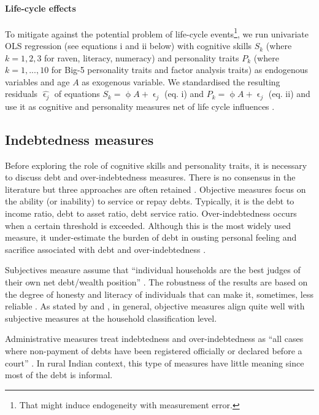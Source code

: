 \documentclass[a4paper, 11pt, onecolumn]{article}
\begin{document}
\paragraph{Life-cycle effects}
To mitigate against the potential problem of life-cycle events\footnote{That might induce endogeneity with measurement error.}, we run univariate OLS regression (see equations i and ii below) with cognitive skills $S_k$ (where $k=1, 2, 3$ for raven, literacy, numeracy) and personality traits $P_k$ (where $k=1,...,10$ for Big-5 personality traits and factor analysis traits) as endogenous variables and age $A$ as exogenous variable.
We standardised the resulting residuals $\hat{\upvarepsilon_j}$ of equations $S_k=\upphi A+\upvarepsilon_j$ (eq. i) and $P_k=\upphi A+\upvarepsilon_j$ (eq. ii) and use it as cognitive and personality measures net of life cycle influences \citep{Nyhus2005, Brown2014}.




	\subsection{Indebtedness measures}

Before exploring the role of cognitive skills and personality traits, it is necessary to discuss debt and over-indebtedness measures.
There is no consensus in the literature but three approaches are often retained \citep{Betti2007, Ferreira2000}.
Objective measures focus on the ability (or inability) to service or repay debts.
Typically, it is the debt to income ratio, debt to asset ratio, debt service ratio.
Over-indebtedness occurs when a certain threshold is exceeded.
Although this is the most widely used measure, it under-estimate the burden of debt in ousting personal feeling and sacrifice associated with debt and over-indebtedness \citep{Betti2007}.
 
Subjectives measure assume that ``individual households are the best judges of their own net debt/wealth position'' \citep{Betti2007}.
The robustness of the results are based on the degree of honesty and literacy of individuals that can make it, sometimes, less reliable \citep{Betti2007, DAlessio2013}.
As stated by \cite{Rinaldi2006} and \cite{Keese2012}, in general, objective measures align quite well with subjective measures at the household classification level.

Administrative measures treat indebtedness and over-indebtedness as ``all cases
where non-payment of debts have been registered officially or declared before a court'' \citep{Betti2007}.
In rural Indian context, this type of measures have little meaning since most of the debt is informal.
\end{document}
